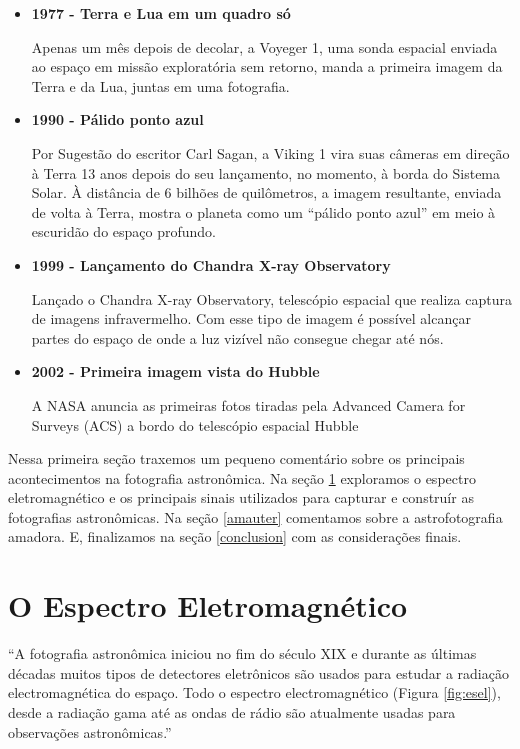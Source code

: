 \documentclass[
	article,			%
	12pt,				%
	oneside,			%
	a4paper,			%
	english,			%
	brazil,				%
	sumario=tradicional
	]{abntex2}
\begin{document}
\begin{itemize}
	\item \textbf{1977 - Terra e Lua em um quadro só}

	Apenas um mês depois de decolar, a Voyeger 1, uma sonda espacial enviada ao
	espaço em missão exploratória sem retorno, manda a primeira imagem da Terra
	e da Lua, juntas em uma fotografia. \cite{fotografia2011ng}

	\item \textbf{1990 - Pálido ponto azul}

	Por Sugestão do escritor Carl Sagan, a Viking 1 vira suas câmeras em direção
	à Terra 13 anos depois do seu lançamento, no momento, à borda do Sistema
	Solar. À distância de 6 bilhões de quilômetros, a imagem resultante, enviada
	de volta à Terra, mostra o planeta como um ``pálido ponto azul'' em meio à
	escuridão do espaço profundo. \cite{fotografia2011ng}

	\item \textbf{1999 - Lançamento do Chandra X-ray Observatory}

	Lançado o Chandra X-ray Observatory, telescópio espacial que realiza captura
	de imagens infravermelho. Com esse tipo de imagem é possível alcançar partes
	do espaço de onde a luz vizível não consegue chegar até nós.
	\cite{chandraxray}

	\item \textbf{2002 - Primeira imagem vista do Hubble}

	A NASA anuncia as primeiras fotos tiradas pela Advanced Camera for Surveys
	(ACS) a bordo do telescópio espacial Hubble \cite{fotografia2011ng}
\end{itemize} 

Nessa primeira seção traxemos um pequeno comentário sobre os principais
acontecimentos na fotografia astronômica. Na seção \ref{espectre} exploramos o
espectro eletromagnético e os principais sinais utilizados para capturar e
construír as fotografias astronômicas. Na seção \ref{amauter} comentamos sobre a
astrofotografia amadora. E, finalizamos na seção \ref{conclusion} com as
considerações finais.

\section{O Espectro Eletromagnético}
\label{espectre}

\begin{citacao}
	``A fotografia astronômica iniciou no fim do século XIX e durante as últimas 
	décadas muitos tipos de detectores eletrônicos são usados para estudar a
	radiação electromagnética do espaço. Todo o espectro electromagnético
	(Figura \ref{fig:esel}), desde a radiação gama até as ondas de rádio são
	atualmente usadas para observações astronômicas.'' \cite{fotometria}
\end{citacao}
\end{document}
